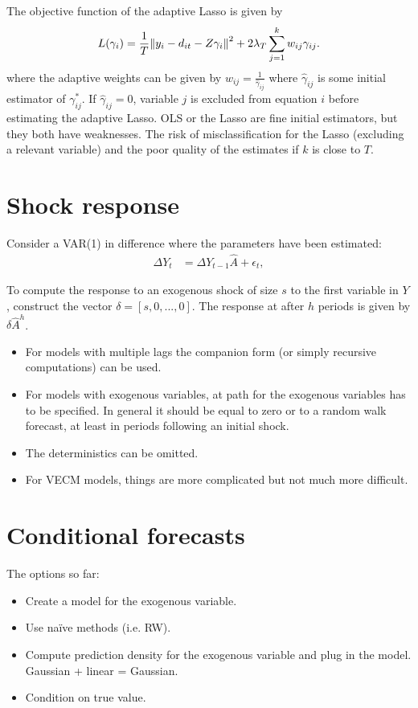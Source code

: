 \documentclass[11pt,oneside, a4paper]{amsart}\usepackage[]{graphicx}\usepackage[]{color}
\begin{document}
The objective function of the adaptive Lasso is given by 
\begin{align}
L(\gamma_{i})=\frac{1}{T}\enVert{y_{i}-d_{it}-Z\gamma_{i}}^2+2\lambda_T\sum_{j=1}^{k}w_{ij}\gamma_{ij}\label{eq:objada}.
\end{align}
where the adaptive weights can be given by $w_{ij}=\frac{1}{\hat\gamma_{ij}}$ where $\hat\gamma_{ij}$ is some initial estimator of $\gamma^*_{ij}$. If $\hat\gamma_{ij}=0$, variable $j$ is excluded from equation $i$ before estimating the adaptive Lasso. OLS or the Lasso are fine initial estimators, but they both have weaknesses. The risk of misclassification for the Lasso (excluding a relevant variable) and the poor quality of the estimates if $k$ is close to $T$.    



\section*{Shock response}

Consider a VAR(1) in difference where the parameters have been estimated:
\begin{align}
\Delta Y_t &= \Delta Y_{t-1} \hat A + \epsilon_t,\nonumber
\end{align}

To compute the response to an exogenous shock of size $s$ to the first variable in $Y$, construct the vector $\delta =[s,0,...,0]$. The response at after $h$ periods is given by $\delta \hat A^h$. 
\begin{itemize}
\item For models with multiple lags the companion form (or simply recursive computations) can be used.
\item For models with exogenous variables, at path for the exogenous variables has to be specified. In general it should be equal to zero or to a random walk forecast, at least in periods following an initial shock. 
\item The deterministics can be omitted. 
\item For VECM models, things are more complicated but not much more difficult.    
\end{itemize}


\section*{Conditional forecasts}

The options so far:
\begin{itemize}
\item Create a model for the exogenous variable. 
\item Use na\"{i}ve methods (i.e. RW).
\item Compute prediction density for the exogenous variable and plug in the model. Gaussian + linear = Gaussian.
\item Condition on true value. 
\end{itemize}
\end{document}

